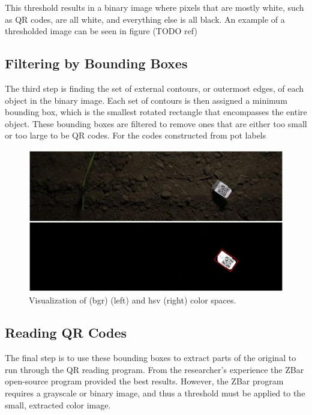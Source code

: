 This threshold results in a binary image where pixels that are mostly white, such as QR codes, are all white, and everything else is all black.  An example of a thresholded image can be seen in figure (TODO ref)

\subsection{Filtering by Bounding Boxes}

The third step is finding the set of external contours, or outermost edges, of each object in the binary image.  Each set of contours is then assigned a minimum bounding box, which is the smallest rotated rectangle that encompasses the entire object.  These bounding boxes are filtered to remove ones that are either too small or too large to be QR codes.  For the codes constructed from pot labels 

\begin{figure}
	\centering
    \includegraphics[width=5in]{figures/code_extraction_step1.jpg}
    \caption[Color spaces]{Visualization of \ac{(bgr)} (left) and \ac{hsv} (right) color spaces.}
    \label{figure:code_extraction}
\end{figure} 

\subsection{Reading QR Codes}
\label{section:reading_codes}

The final step is to use these bounding boxes to extract parts of the original to run through the QR reading program.  From the researcher's experience the ZBar open-source program provided the best results.  However, the ZBar program requires a grayscale or binary image, and thus a threshold must be applied to the small, extracted color image. 

